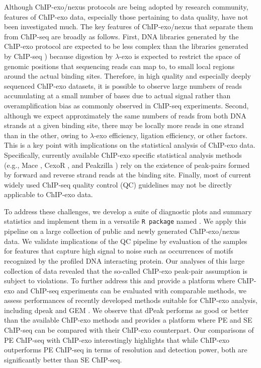 Although ChIP-exo/nexus protocols are being adopted by research
community, features of ChIP-exo data, especially those pertaining to
data quality, have not been investigated much. The key features of
ChIP-exo/nexus that separate them from ChIP-seq are broadly as
follows. First, DNA libraries generated by the ChIP-exo protocol are
expected to be less complex than the libraries generated by ChIP-seq
\cite{exo_review}) because digestion by $\lambda$-exo is expected to
restrict the space of genomic positions that sequencing reads can map
to, to small local regions around the actual binding sites. Therefore,
in high quality and especially deeply sequenced ChIP-exo datasets, it
is possible to observe large numbers of reads accumulating at a small
number of bases due to actual signal rather than overamplification
bias as commonly observed in ChIP-seq experiments.  Second, although
we expect approximately the same numbers of reads from both DNA
strands at a given binding site, there may be locally more reads in
one strand than in the other, owing to $\lambda$-exo efficiency,
ligation efficiency, or other factors.  This is a key point with
implications on the statistical analysis of ChIP-exo
data. Specifically, currently available ChIP-exo specific statistical
analysis methods (e.g., Mace \cite{mace}, CexoR \cite{cexor}, and
Peakzilla \cite{peakzilla}) rely on the existence of peak-pairs formed
by forward and reverse strand reads at the binding site.  Finally,
most of current widely used ChIP-seq quality control (QC) guidelines
\cite{encode_qc} may not be directly applicable to ChIP-exo data.

To address these challenges, we develop a suite of diagnostic plots
and summary statistics and implement them in a versatile \texttt{R
  package} named \pname{}.  We apply this pipeline on a large
collection of public and newly generated ChIP-exo/nexus data. We
validate implications of the QC pipeline by evaluation of the samples
for features that capture high signal to noise such as occurrences of
motifs recognized by the profiled DNA interacting protein. Our
analyses of this large collection of data revealed that the so-called
ChIP-exo peak-pair assumption is subject to violations. To further
address this and provide a platform where ChIP-exo and ChIP-seq
experiments can be evaluated with comparable methods, we assess
performances of recently developed methods suitable for ChIP-exo
analysis, including dpeak \cite{dpeak} and GEM \cite{gem}. We observe
that dPeak performs as good or better than the available ChIP-exo
methods and provides a platform where PE and SE ChIP-seq can be
compared with their ChIP-exo counterpart. Our comparisons of PE
ChIP-seq with ChIP-exo interestingly highlights that while ChIP-exo
outperforms PE ChIP-seq in terms of resolution and detection power,
both are significantly better than SE ChIP-seq.
